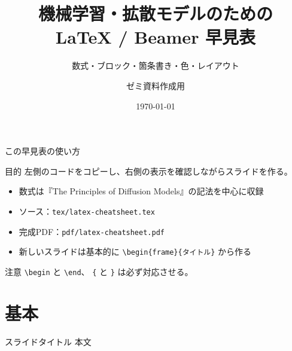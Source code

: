 \documentclass[aspectratio=169,10pt]{beamer}
\title{機械学習・拡散モデルのための\\LaTeX / Beamer 早見表}
\subtitle{数式・ブロック・箇条書き・色・レイアウト}
\author{ゼミ資料作成用}
\date{\today}
\begin{document}
\begin{frame}
  \titlepage
\end{frame}

\begin{frame}{この早見表の使い方}
  \begin{block}{目的}
    左側のコードをコピーし、右側の表示を確認しながらスライドを作る。
  \end{block}

  \begin{itemize}
    \item 数式は『The Principles of Diffusion Models』の記法を中心に収録
    \item ソース：\texttt{tex/latex-cheatsheet.tex}
    \item 完成PDF：\texttt{pdf/latex-cheatsheet.pdf}
    \item 新しいスライドは基本的に
      \texttt{\textbackslash begin\{frame\}\{タイトル\}} から作る
  \end{itemize}

  \begin{alertblock}{注意}
    \texttt{\textbackslash begin} と \texttt{\textbackslash end}、
    \texttt{\{} と \texttt{\}} は必ず対応させる。
  \end{alertblock}
\end{frame}

\section{基本}


\begin{frame}{スライドタイトル}
  本文
\end {frame}
\end{document}
